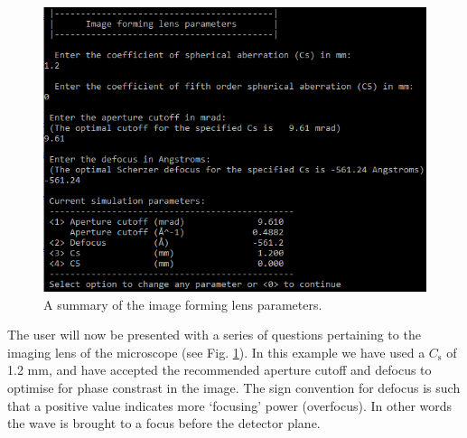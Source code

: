 \documentclass[12pt,a4paper]{article}
\begin{document}
%

\begin{figure}[!h]
\begin{center}
    \includegraphics[scale=0.75]{pw_abs_lens.png}
\caption{A summary of the image forming lens parameters.}
\label{fig:pw_abs_lens}
\end{center}
\end{figure}

The user will now be presented with a series of questions pertaining to the imaging lens of the microscope (see Fig. \ref{fig:pw_abs_lens}). 
In this example we have used a $C_\text{s}$ of 1.2 mm, and have accepted the recommended aperture cutoff and defocus to optimise for phase constrast in the image.
The sign convention for defocus is such that a positive value indicates more `focusing' power (overfocus). 
In other words the wave is brought to a focus before the detector plane.  
\end{document}
